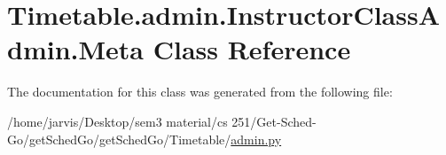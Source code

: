 \hypertarget{classTimetable_1_1admin_1_1InstructorClassAdmin_1_1Meta}{}\section{Timetable.\+admin.\+Instructor\+Class\+Admin.\+Meta Class Reference}
\label{classTimetable_1_1admin_1_1InstructorClassAdmin_1_1Meta}


The documentation for this class was generated from the following file\+:\begin{DoxyCompactItemize}
\item 
/home/jarvis/\+Desktop/sem3 material/cs 251/\+Get-\/\+Sched-\/\+Go/get\+Sched\+Go/get\+Sched\+Go/\+Timetable/\hyperlink{Timetable_2admin_8py}{admin.\+py}\end{DoxyCompactItemize}
